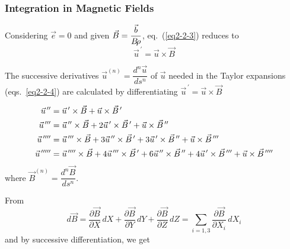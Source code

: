 \begin{figure}[H]
\end{figure}

\subsubsection{Integration in Magnetic Fields} \label{sec2.2.1}  %

Considering  $ \vec  e=0 $ and given  $ \vec B=\dfrac{\vec  b}{B\!\rho} $, 
eq.~(\ref{eq2-2-3}) reduces to 
\begin{equation}
 \vec  u^{\,\prime}  = \vec  u  \times  \vec  B   	\label{eqBBrho}
\end{equation}

\noindent The successive derivatives $\vec  u^{(n)} = \dfrac{d^n\vec  u }{ds^n} $ of 
$ \vec  u $ needed in the Taylor expansions (eqs.~\ref{eq2-2-4}) are calculated by differentiating 
$ \vec  u^{\,\prime}            =\vec  u  \times  \vec  B$ 

\begin{equation}
	\begin{aligned}
		\vec  u^{\,\prime\prime}
		         &   =   \vec  u^{\,\prime}   \times   \vec  B + \vec  u  \times  
		         \vec B^{\,\prime} \\
		\vec u^{\,\prime\prime\prime}
		         & = \vec  u^{\,\prime\prime}   \times   \vec  B 
		         + 2\vec  u^{\,\prime}  \times   \vec  B^{\,\prime}  
		         + \vec  u \times  \vec  B^{\,\prime\prime} \\
		\vec u^{\,\prime\prime\prime\prime} 
		         &   =  \vec u^{\,\prime\prime\prime}  \times   \vec  B 
		         + 3\vec  u^{\,\prime\prime}   \times  \vec  B^{\,\prime}  
		         + 3\vec  u^{\,\prime}   \times   \vec  B^{\,\prime\prime}   
		         +\vec	u  \times  \vec  B^{\,\prime\prime\prime} \\
		\vec  u^{\,\prime\prime\prime\prime\prime}
		         &  =  \vec u^{\,\prime\prime\prime\prime}  \times \vec  B 
		         + 4\vec u^{\,\prime\prime\prime}  \times  \vec  B^{\,\prime}  
		         + 6\vec  u^{\,\prime\prime} \times   \vec  B^{\,\prime\prime}  
		         + 4\vec  u^{\,\prime}   \times   \vec B^{\,\prime\prime\prime} 
		         + \vec  u  \times   \vec  B^{\,\prime\prime\prime\prime}
	\end{aligned}
	\label{eq2-2-6}
\end{equation}
%
 where $ \vec  B^{(n)} = \dfrac{d^n\vec  B}{ds^n}$. 

\noindent From  
\begin{equation} d\vec  B = \dfrac{\partial\vec  B}{\partial X}\, dX
     +\dfrac{\partial\vec  B}{\partial Y}\, dY+
     \dfrac{\partial\vec  B}{\partial Z}\, dZ
     = \sum_{i=1,3}\dfrac{\partial\vec  B}{\partial X_i}\, dX_i
 	\label{eq2-2-7a}
\end{equation}
and by successive differentiation, we get 

